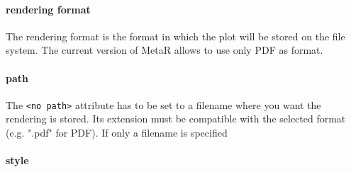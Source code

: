 \paragraph{rendering format}
The rendering format is the format in which the plot will be stored on the file system. The current version of MetaR allows to use only PDF as format. 

\paragraph{path}
The \texttt{<no path>} attribute has to be set to a filename where you want the rendering is stored. Its extension must be compatible with the selected format (e.g. ".pdf" for PDF). If only a filename is specified

\paragraph{style}
  
